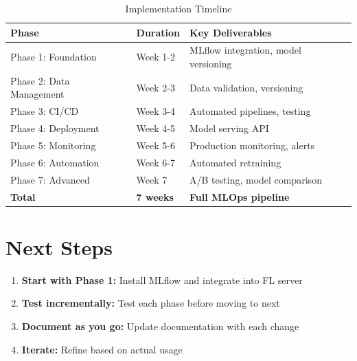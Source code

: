 \documentclass[12pt]{article}
\begin{document}
\begin{table}[h]
\centering
\begin{tabular}{|l|l|l|}
\hline
\textbf{Phase} & \textbf{Duration} & \textbf{Key Deliverables} \\
\hline
Phase 1: Foundation & Week 1-2 & MLflow integration, model versioning \\
Phase 2: Data Management & Week 2-3 & Data validation, versioning \\
Phase 3: CI/CD & Week 3-4 & Automated pipelines, testing \\
Phase 4: Deployment & Week 4-5 & Model serving API \\
Phase 5: Monitoring & Week 5-6 & Production monitoring, alerts \\
Phase 6: Automation & Week 6-7 & Automated retraining \\
Phase 7: Advanced & Week 7 & A/B testing, model comparison \\
\hline
\textbf{Total} & \textbf{7 weeks} & \textbf{Full MLOps pipeline} \\
\hline
\end{tabular}
\caption{Implementation Timeline}
\end{table}

\section{Next Steps}

\begin{enumerate}
    \item \textbf{Start with Phase 1:} Install MLflow and integrate into FL server
    \item \textbf{Test incrementally:} Test each phase before moving to next
    \item \textbf{Document as you go:} Update documentation with each change
    \item \textbf{Iterate:} Refine based on actual usage
\end{enumerate}
\end{document}
